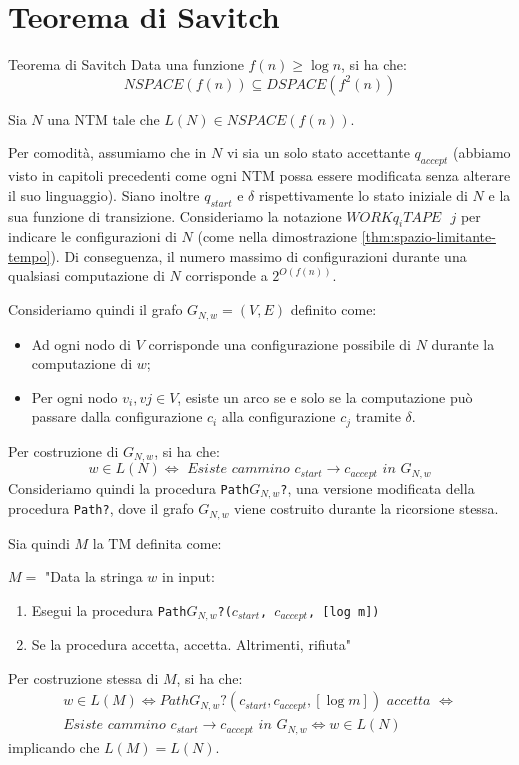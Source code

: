 \section{Teorema di Savitch}
\begin{Thm}{Teorema di Savitch}{}
Data una funzione $f(n)\geq \log n$, si ha che:
\begin{equation*}
    NSPACE(f(n))\subseteq DSPACE(f^2(n))    
\end{equation*}
\begin{demonstration}
Sia $N$ una NTM tale che $L(N)\in NSPACE(f(n))$. 

Per comodità, assumiamo che in $N$ vi sia un solo stato accettante $q_{accept}$ (abbiamo visto in capitoli precedenti come ogni NTM possa essere modificata senza alterare il suo linguaggio). Siano inoltre $q_{start}$ e $\delta$ rispettivamente lo stato iniziale di $N$ e la sua funzione di
transizione. Consideriamo la notazione $WORKq_iTAPE\textit{ }j$ per indicare le configurazioni di $N$ (come nella dimostrazione \ref{thm:spazio-limitante-tempo}). Di conseguenza, il numero massimo di configurazioni durante una qualsiasi computazione di $N$ corrisponde a $2^{O(f(n))}$.

Consideriamo quindi il grafo $G_{N,w} = (V, E)$ definito come:
\begin{itemize}
    \item Ad ogni nodo di $V$ corrisponde una configurazione possibile di $N$ durante la computazione di $w$;
    \item Per ogni nodo $v_i, vj\in V$, esiste un arco se e solo se la computazione può passare dalla configurazione $c_i$ alla configurazione $c_j$ tramite $\delta$.
\end{itemize}
Per costruzione di $G_{N,w}$, si ha che:
\begin{equation*}
    w\in L(N)\iff\textit{ Esiste cammino }c_{start}\to c_{accept}\textit{ in }G_{N,w}
\end{equation*}
Consideriamo quindi la procedura \texttt{Path$G_{N,w}$?}, una versione modificata della procedura \texttt{Path?}, dove il grafo $G_{N,w}$ viene costruito durante la ricorsione stessa.

Sia quindi $M$ la TM definita come:

$M =$ "Data la stringa $w$ in input:
\begin{enumerate}
    \item Esegui la procedura \texttt{Path$G_{N,w}$?($c_{start}$, $c_{accept}$, [log m])}
    \item Se la procedura accetta, accetta. Altrimenti, rifiuta"
\end{enumerate}
Per costruzione stessa di $M$, si ha che:
\begin{align*}
w\in L(M)\iff PathG_{N,w}?(c_{start}, c_{accept}, [\log m])\textit{ accetta }\iff\\
\textit{Esiste cammino }c_{start}\to c_{accept}\textit{ in }G_{N,w}\iff w\in L(N)
\end{align*}
implicando che $L(M) = L(N)$.


\end{demonstration}
\end{Thm}

